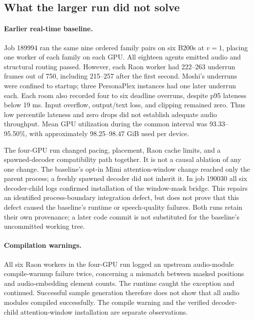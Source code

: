 \documentclass{article}
\begin{document}
\subsection{What the larger run did not solve}
\paragraph{Earlier real-time baseline.} Job 189994 ran the same nine ordered family pairs on six B200s at $v=1$, placing one worker of each family on each GPU. All eighteen agents emitted audio and structural routing passed. However, each Raon worker had 222--263 underrun frames out of 750, including 215--257 after the first second. Moshi's underruns were confined to startup; three PersonaPlex instances had one later underrun each. Each room also recorded four to six deadline overruns, despite p95 lateness below 19 ms. Input overflow, output/text loss, and clipping remained zero. Thus low percentile lateness and zero drops did not establish adequate audio throughput. Mean GPU utilization during the common interval was 93.33--95.50\%, with approximately 98.25--98.47 GiB used per device.

The four-GPU run changed pacing, placement, Raon cache limits, and a spawned-decoder compatibility path together. It is not a causal ablation of any one change. The baseline's opt-in Mimi attention-window change reached only the parent process; a freshly spawned decoder did not inherit it. In job 190030 all six decoder-child logs confirmed installation of the window-mask bridge. This repairs an identified process-boundary integration defect, but does not prove that this defect caused the baseline's runtime or speech-quality failures. Both runs retain their own provenance; a later code commit is not substituted for the baseline's uncommitted working tree.

\paragraph{Compilation warnings.} All six Raon workers in the four-GPU run logged an upstream audio-module compile-warmup failure twice, concerning a mismatch between masked positions and audio-embedding element counts. The runtime caught the exception and continued. Successful sample generation therefore does not show that all audio modules compiled successfully. The compile warning and the verified decoder-child attention-window installation are separate observations.
\end{document}
